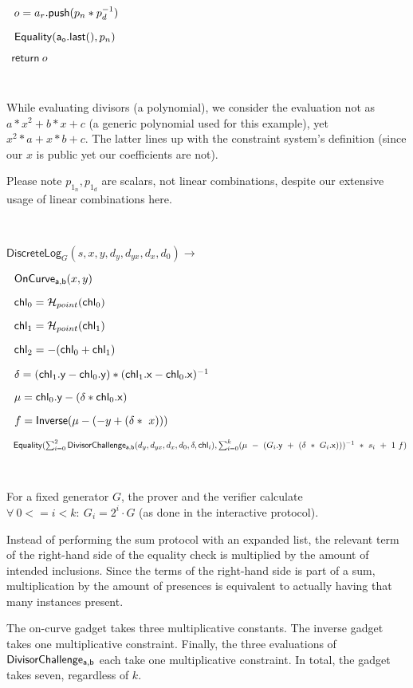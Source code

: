 \documentclass[]{article}
\begin{document}
	$~~o = a_r\mathsf{.push}(p_n * p_d^{-1})$
	
	$~~\mathsf{Equality}(\mathsf{a_o.last()}, p_n)$
	
	$~~\mathsf{return} ~o$
	
	\
	
	While evaluating divisors (a polynomial), we consider the evaluation not as $a * x^2 + b * x + c$ (a generic polynomial used for this example), yet $x^2 * a + x * b + c$. The latter lines up with the constraint system's definition (since our $x$ is public yet our coefficients are not).

	Please note $p_{1_n}, p_{1_d}$ are scalars, not linear combinations, despite our extensive usage of linear combinations here.
	
	\
	
	\newcommand{\circuitin}{\leftarrow \mathsf{Prover ~(Vector ~Commitment)}}
	
	\newcommand{\dlog}{\mathsf{DiscreteLog}}
	
	$\dlog_G(s, x, y, d_y, d_{yx}, d_x, d_0) \rightarrow$
	
	$~~\mathsf{OnCurve_{a,b}}(x, y)$
	
	$~~\mathsf{chl}_0 = \mathcal{H}_{point}(\mathsf{chl}_0)$
	
	$~~\mathsf{chl}_1 = \mathcal{H}_{point}(\mathsf{chl}_1)$
	
	$~~\mathsf{chl}_2 = -(\mathsf{chl}_0 + \mathsf{chl}_1)$
	
	$~~\delta = (\mathsf{chl}_1\mathsf{.y} - \mathsf{chl}_0\mathsf{.y}) * (\mathsf{chl}_1\mathsf{.x} - \mathsf{chl}_0\mathsf{.x})^{-1}$
	
	$~~\mu = \mathsf{chl}_0\mathsf{.y} - (\delta * \mathsf{chl}_0\mathsf{.x})$
	
	$~~f = \mathsf{Inverse}(\mu - (-y + (\delta * ~x)))$
	
	$~~\mathsf{Equality}(\sum^2_{i=0} \mathsf{DivisorChallenge_{a,b}}(d_y, d_{yx}, d_x, d_0, \delta, \mathsf{chl}_i), \sum^k_{i=0} (\mu ~-~ (G_i\mathsf{.y} ~+~ (\delta ~*~ G_i\mathsf{.x})))^{-1} ~*~ s_i ~+~ 1 ~f)$
	
	\
	
	For a fixed generator $G$, the prover and the verifier calculate $\forall~ 0 <= i < k:~ G_i = 2^i \cdot G$ (as done in the interactive protocol).
	
	Instead of performing the sum protocol with an expanded list, the relevant term of the right-hand side of the equality check is multiplied by the amount of intended inclusions. Since the terms of the right-hand side is part of a sum, multiplication by the amount of presences is equivalent to actually having that many instances present.
	
	The on-curve gadget takes three multiplicative constants. The inverse gadget takes one multiplicative constraint. Finally, the three evaluations of $\mathsf{DivisorChallenge_{a,b}}$ each take one multiplicative constraint. In total, the gadget takes seven, regardless of $k$.
\end{document}
